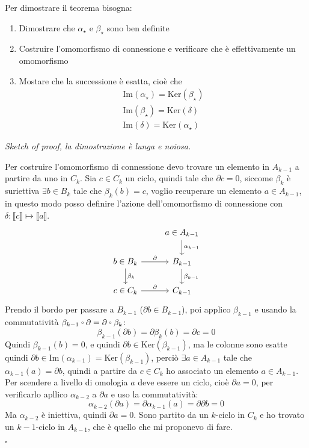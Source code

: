 \documentclass[10pt, twoside=false, x11names]{scrbook}
\newenvironment{proof}{{\textbf{Dimostrazione}:}}{\hfill $\square$}
\newcommand{\im}[1]{\mathrm{Im}( #1 )}
\renewcommand{\ker}[1]{\mathrm{Ker}( #1)}
\let\latexcirc=\circ
\newcommand{\ccirc}{\mathbin{\mathchoice
  {\xcirc\scriptstyle}
  {\xcirc\scriptstyle}
  {\xcirc\scriptscriptstyle}
  {\xcirc\scriptscriptstyle}
}}
\newcommand{\xcirc}[1]{\vcenter{\hbox{$#1\latexcirc$}}}
\let\circ\ccirc
\begin{document}
\begin{proof}
  Per dimostrare il teorema bisogna:
  \begin{enumerate}
  \item Dimostrare che $ \alpha_\star $ e $ \beta_\star $ sono ben definite
  \item Costruire l'omomorfismo di connessione e verificare che è effettivamente un omomorfismo
  \item Mostare che la successione è esatta, cioè che
    \begin{gather*}
      \im{\alpha_\star} = \ker{\beta_\star} \\
      \im{\beta_\star} = \ker{\delta} \\
      \im{\delta} = \ker{\alpha_\star}
    \end{gather*}
  \end{enumerate}
  \emph{Sketch of proof, la dimostrazione è lunga e noiosa.}

  Per costruire l'omomorfismo di connessione devo trovare un
  elemento in $ A_{k-1} $ a partire da uno in $ C_k $.
  Sia $ c \in C_k $ un ciclo, quindi tale che $ \partial c = 0 $,
  siccome $ \beta_k $ è suriettiva $ \exists b \in B_k $ tale che
  $ \beta_k(b) = c $, voglio recuperare un elemento $ a \in A_{k-1} $,
  in questo modo posso definire l'azione dell'omomorfismo
  di connessione con $ \delta \colon \llbracket c \rrbracket \mapsto \llbracket a \rrbracket $.
  \[
    \begin{tikzcd}
      {} & a \in A_{k-1} \arrow{d}{\alpha_{k-1}} \\
      b \in B_k \arrow{r}{\partial} \arrow{d}{\beta_k} & B_{k-1} \arrow{d}{\beta_{k-1}} \\
      c \in C_k \arrow{r}{\partial} & C_{k-1}
    \end{tikzcd}
  \]
  Prendo il bordo per passare a $ B_{k-1} $ ($ \partial b \in B_{k-1} $), poi
  applico $ \beta_{k-1} $ e usando la commutatività $ \beta_{k-1} \circ \partial = \partial \circ \beta_k $:
  \[
    \beta_{k-1}(\partial b) = \partial \beta_k (b) = \partial c = 0
  \]
  Quindi $ \beta_{k-1}(b) = 0 $, e quindi $ \partial b \in \ker{\beta_{k-1}} $, ma
  le colonne sono esatte quindi $ \partial b \in \im{\alpha_{k-1}} = \ker{\beta_{k-1}} $,
  perciò $ \exists a \in A_{k-1} $ tale che $ \alpha_{k-1}(a) = \partial b $, quindi
  a partire da $ c \in C_k $ ho associato un elemento $ a \in A_{k-1} $.
  Per scendere a livello di omologia $ a $ deve essere un ciclo,
  cioè $ \partial a = 0 $, per verificarlo apllico $ \alpha_{k-2} $ a $ \partial a $
  e uso la commutatività:
  \[
    \alpha_{k-2}(\partial a) = \partial \alpha_{k-1}(a) = \partial \partial b = 0
  \]
  Ma $ \alpha_{k-2} $ è iniettiva, quindi $ \partial a = 0 $.
  Sono partito da un $ k $-ciclo in $ C_k $ e
  ho trovato un $ k-1 $-ciclo in $ A_{k-1} $,
  che è quello che mi proponevo di fare.


\end{proof}
\end{document}
